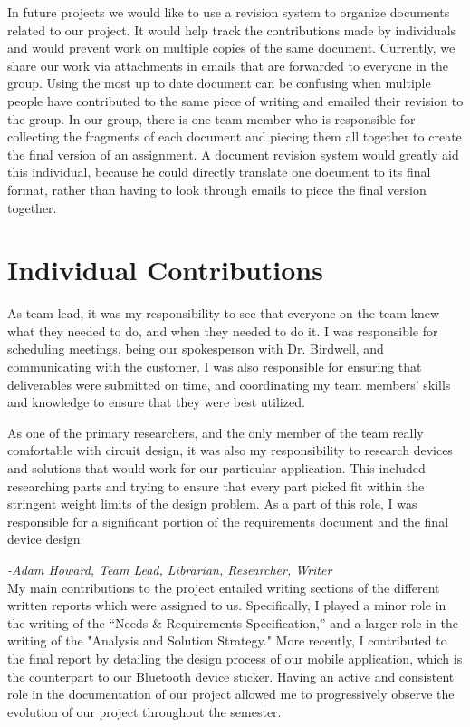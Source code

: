 \documentclass[12pt]{article}
\begin{document}
	In future projects we would like to use a revision system to organize documents related to our project. It would help track the contributions made by individuals and would prevent work on multiple copies of the same document. Currently, we share our work via attachments in emails that are forwarded to everyone in the group. Using the most up to date document can be confusing when multiple people have contributed to the same piece of writing and emailed their revision to the group. In our group, there is one team member who is responsible for collecting the fragments of each document and piecing them all together to create the final version of an assignment. A document revision system would greatly aid this individual, because he could directly translate one document to its final format, rather than having to look through emails to piece the final version together. 	
	
	\section{Individual Contributions}
	
	    As team lead, it was my responsibility to see that everyone on the team knew what they needed to do, and when they needed to do it. I was responsible for scheduling meetings, being our spokesperson with Dr. Birdwell, and communicating with the customer. I was also responsible for ensuring that deliverables were submitted on time, and coordinating my team members’ skills and knowledge to ensure that they were best utilized. 
	    
	    As one of the primary researchers, and the only member of the team really comfortable with circuit design, it was also my responsibility to research devices and solutions that would work for our particular application. This included researching parts and trying to ensure that every part picked fit within the stringent weight limits of the design problem. As a part of this role, I was responsible for a significant portion of the requirements document and the final device design.
	    
	    \emph{-Adam Howard,
	    	 Team Lead,
	    	 Librarian,
	    	 Researcher,
	    	 Writer} \\
	    
	    My main contributions to the project entailed writing sections of the different written reports which were assigned to us. Specifically, I played a minor role in the writing of the ``Needs \& Requirements Specification,'' and a larger role in the writing of the "Analysis and Solution Strategy." More recently, I contributed to the final report by detailing the design process of our mobile application, which is the counterpart to our Bluetooth device sticker. Having an active and consistent role in the documentation of our project allowed me to progressively observe the evolution of our project throughout the semester.
		
\end{document}
